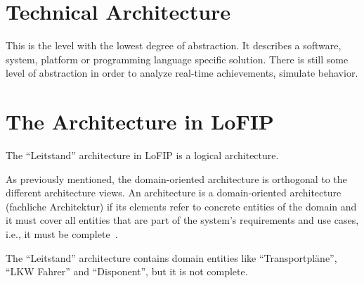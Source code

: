 \documentclass{llncs} %
\begin{document}
\section{Technical Architecture}


This is the level with the lowest degree of abstraction. 
It describes a software, system, platform or programming language specific solution.
There is still some level of abstraction in order to analyze real-time achievements,
simulate behavior.

\section{The Architecture in LoFIP}
\label{sec:lofip}

The ``Leitstand'' architecture in LoFIP is a logical architecture.

As previously mentioned, the domain-oriented architecture  is orthogonal to the different
architecture views.
An architecture is a domain-oriented architecture (fachliche Architektur)
if its elements refer to concrete entities of the domain and
it must cover all entities that are part of the system's requirements and use cases,
i.e., it must be complete~\cite{Posch2004BS}.


The ``Leitstand'' architecture contains domain entities like ``Transportpl{\"a}ne'',
``LKW Fahrer'' and ``Disponent'', but it is not complete. 








\end{document}
